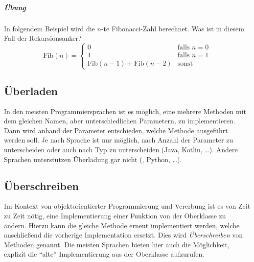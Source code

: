 		\subparagraph{Übung}
		In folgendem Beispiel wird die \(n\)-te Fibonacci-Zahl berechnet. Was ist in diesem Fall der Rekursionsanker?
		\begin{equation*}
			\text{Fib}(n) =
				\begin{cases}
					0                                     & \text{falls } n = 0 \\
					1                                     & \text{falls } n = 1 \\
					\text{Fib}(n - 1) + \text{Fib}(n - 2) & \text{sonst}
				\end{cases}
		\end{equation*}

\subsection{Überladen} \functionalMark \imperativeMark \oopMark
	In den meisten Programmiersprachen ist es möglich, eine mehrere Methoden mit dem gleichen Namen, aber unterschiedlichen Parametern, zu implementieren. Dann wird anhand der Parameter entschieden, welche Methode ausgeführt werden soll. Je nach Sprache ist nur möglich, nach Anzahl der Parameter zu unterscheiden oder auch nach Typ zu unterscheiden (Java, Kotlin, \dots). Andere Sprachen unterstützen Überladung gar nicht (\racket, Python, \dots).

\subsection{Überschreiben} \oopMark
	Im Kontext von objektorientierter Programmierung und Vererbung ist es von Zeit zu Zeit nötig, eine Implementierung einer Funktion von der Oberklasse zu ändern. Hierzu kann die gleiche Methode erneut implementiert werden, welche anschließend die vorherige Implementation ersetzt. Dies wird \textit{Überschreiben} von Methoden genannt. Die meisten Sprachen bieten hier auch die Möglichkeit, explizit die \enquote{alte} Implementierung aus der Oberklasse aufzurufen.

